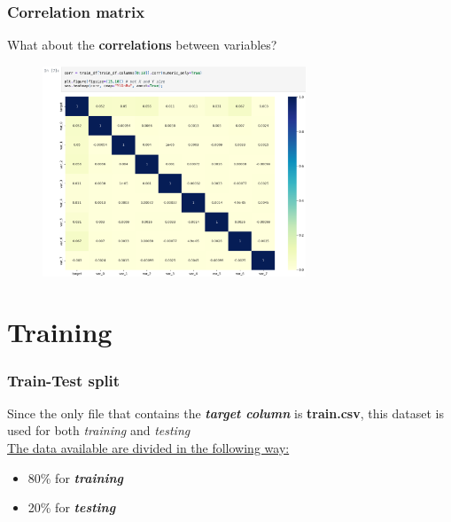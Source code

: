 \documentclass{beamer}
\begin{document}
\begin{frame}
\frametitle{Correlation matrix}
What about the \textbf{correlations} between variables?
\begin{figure}
\centering
    \includegraphics[width=0.7\textwidth]{imgs/matrix.png}
    \label{fig:matrix}
\end{figure}
\end{frame}


\section{Training}

\begin{frame}
\frametitle{Train-Test split}
Since the only file that contains the \textbf{\textit{target column}} is \textbf{train.csv}, this dataset is used for both \textit{training} and \textit{testing}
\newline\\
\underline{The data available are divided in the following way:}
\begin{itemize}
    \item 80\% for \textit{\textbf{training}}
    \item 20\% for \textit{\textbf{testing}}
\end{itemize}
\end{frame}
\end{document}
